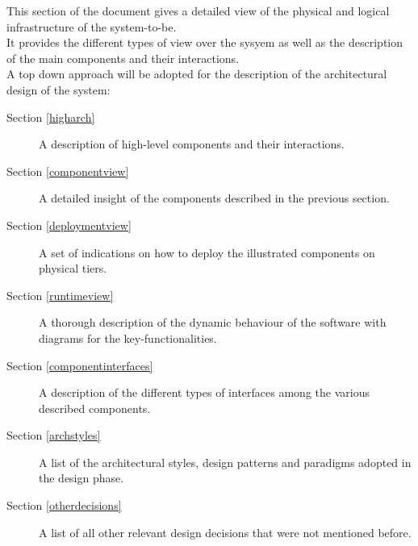 This section of the document gives a detailed view of the physical and logical infrastructure of the system-to-be. 
\\It provides the different types of view over the sysyem as well as the description of the main components and their interactions.
\\A top down approach will be adopted for the description of the architectural design of the system:
\begin{description}
\item[Section \ref{higharch}] A description of high-level components and their interactions.
\item[Section \ref{componentview}] A detailed insight of the components described in the previous section.
\item[Section \ref{deploymentview}] A set of indications on how to deploy the illustrated components on physical tiers.
\item[Section \ref{runtimeview}] A thorough description of the dynamic behaviour of the software with diagrams for the key-functionalities.
\item[Section \ref{componentinterfaces}] A description of the different types of interfaces among the various described components.
\item[Section \ref{archstyles}] 
A list of the architectural styles, design patterns and paradigms adopted in the design phase.
\item[Section \ref{otherdecisions}] A list of all other relevant design decisions that were not mentioned before.
\end{description}